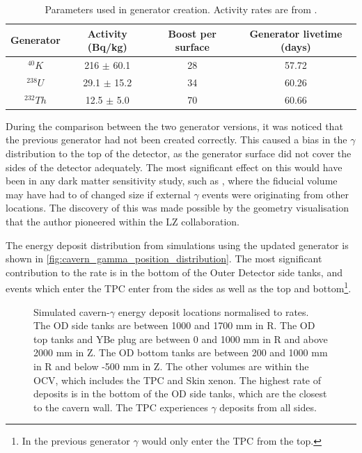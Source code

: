 \begin{table}
    \centering
    \begin{tabular}{c|c|c|c}
        Generator    & Activity (Bq/kg)   & Boost per surface & Generator livetime (days)  \\ \hline
        ${}^{40}K$   & 216 $\pm$ 60.1     & 28                & 57.72                      \\
        ${}^{238}U$  & 29.1 $\pm$ 15.2    & 34                & 60.26                      \\
        ${}^{232}Th$ & 12.5 $\pm$ 5.0     & 70                & 60.66
    \end{tabular}
    \caption{Parameters used in generator creation. Activity rates are from \cite{LZ_Gamma_Ray_Background_ref}.}
    \label{tab:cavern_gamma_generator_parameters}
\end{table}





\par
During the comparison between the two generator versions, it was noticed that the previous generator had not been created correctly.
This caused a bias in the $\gamma$ distribution to the top of the detector, as the generator surface did not cover the sides of the detector adequately.
The most significant effect on this would have been in any dark matter sensitivity study, such as \cite{lz_simulations_ref}, where the fiducial volume may have had to of changed size if external $\gamma$ events were originating from other locations.
The discovery of this was made possible by the geometry visualisation that the author pioneered within the LZ collaboration.

\par
The energy deposit distribution from simulations using the updated generator is shown in \autoref{fig:cavern_gamma_position_distribution}.
The most significant contribution to the rate is in the bottom of the Outer Detector side tanks, and events which enter the TPC enter from the sides as well as the top and bottom\footnote{In the previous generator $\gamma$ would only enter the TPC from the top.}.

\begin{figure}
    \centering
    \resizebox{\textwidth}{!}{

}
    \caption[Simulated cavern-$\gamma$ energy deposit locations normalised to rates.]{Simulated cavern-$\gamma$ energy deposit locations normalised to rates.
             The OD side tanks are between 1000 and 1700 mm in R.
             The OD top tanks and YBe plug are between 0 and 1000 mm in R and above 2000 mm in Z.
             The OD bottom tanks are between 200 and 1000 mm in R and below -500 mm in Z.
             The other volumes are within the OCV, which includes the TPC and Skin xenon.
             The highest rate of deposits is in the bottom of the OD side tanks, which are the closest to the cavern wall.
             The TPC experiences $\gamma$ deposits from all sides.}
    \label{fig:cavern_gamma_position_distribution}
\end{figure}